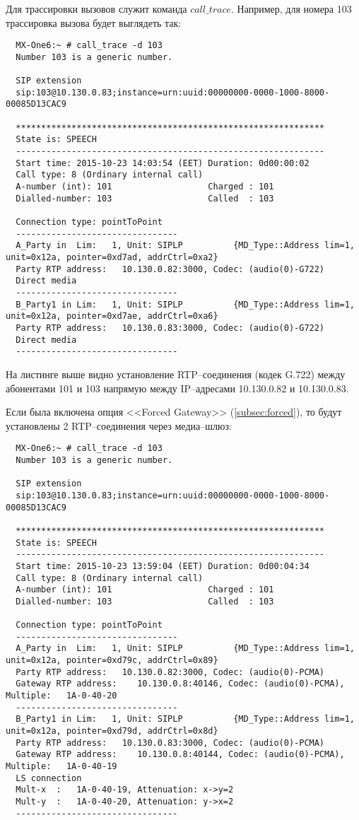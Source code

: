 Для трассировки вызовов служит команда $call\_trace$. Например, для номера 103 трассировка вызова будет выглядеть так:
\begin{lstlisting}
  MX-One6:~ # call_trace -d 103
  Number 103 is a generic number.

  SIP extension
  sip:103@10.130.0.83;instance=urn:uuid:00000000-0000-1000-8000-00085D13CAC9

  *************************************************************
  State is: SPEECH
  -------------------------------------------------------------
  Start time: 2015-10-23 14:03:54 (EET) Duration: 0d00:00:02
  Call type: 8 (Ordinary internal call)
  A-number (int): 101                   Charged : 101
  Dialled-number: 103                   Called  : 103

  Connection type: pointToPoint
  --------------------------------
  A_Party in  Lim:   1, Unit: SIPLP          {MD_Type::Address lim=1, unit=0x12a, pointer=0xd7ad, addrCtrl=0xa2}
  Party RTP address:   10.130.0.82:3000, Codec: (audio(0)-G722)
  Direct media
  --------------------------------
  B_Party1 in Lim:   1, Unit: SIPLP          {MD_Type::Address lim=1, unit=0x12a, pointer=0xd7ae, addrCtrl=0xa6}
  Party RTP address:   10.130.0.83:3000, Codec: (audio(0)-G722)
  Direct media
  --------------------------------
\end{lstlisting}

На листинге выше видно установление RTP--соединения (кодек G.722) между абонентами 101 и 103 напрямую между IP--адресами 10.130.0.82 и 10.130.0.83.

Если была включена опция <<Forced Gateway>> (\ref{subsec:forced}), то будут установлены 2 RTP--соединения через медиа--шлюз:
\begin{lstlisting}
  MX-One6:~ # call_trace -d 103
  Number 103 is a generic number.

  SIP extension
  sip:103@10.130.0.83;instance=urn:uuid:00000000-0000-1000-8000-00085D13CAC9

  *************************************************************
  State is: SPEECH
  -------------------------------------------------------------
  Start time: 2015-10-23 13:59:04 (EET) Duration: 0d00:04:34
  Call type: 8 (Ordinary internal call)
  A-number (int): 101                   Charged : 101
  Dialled-number: 103                   Called  : 103

  Connection type: pointToPoint
  --------------------------------
  A_Party in  Lim:   1, Unit: SIPLP          {MD_Type::Address lim=1, unit=0x12a, pointer=0xd79c, addrCtrl=0x89}
  Party RTP address:   10.130.0.82:3000, Codec: (audio(0)-PCMA)
  Gateway RTP address:    10.130.0.8:40146, Codec: (audio(0)-PCMA), Multiple:   1A-0-40-20
  --------------------------------
  B_Party1 in Lim:   1, Unit: SIPLP          {MD_Type::Address lim=1, unit=0x12a, pointer=0xd79d, addrCtrl=0x8d}
  Party RTP address:   10.130.0.83:3000, Codec: (audio(0)-PCMA)
  Gateway RTP address:    10.130.0.8:40144, Codec: (audio(0)-PCMA), Multiple:   1A-0-40-19
  LS connection
  Mult-x  :   1A-0-40-19, Attenuation: x->y=2
  Mult-y  :   1A-0-40-20, Attenuation: y->x=2
  --------------------------------
\end{lstlisting}

